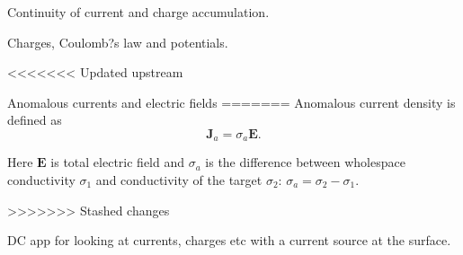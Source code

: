 \documentclass[11pt,letterpaper,leqno]{amsart}
\numberwithin{equation}{section}
\begin{document}
\vspace{0.4cm}

Continuity of current and charge accumulation. 

 \vspace{0.4cm}

Charges, Coulomb?s law and potentials.

<<<<<<< Updated upstream
 \vspace{0.4cm}

Anomalous currents and electric fields
=======
Anomalous current density is defined as 
\begin{equation*}
\mathbf{J}_a = \sigma_a\mathbf{E}.
\end{equation*}

Here $\mathbf{E}$ is total electric field and $\sigma_a$ is the difference between wholespace conductivity $\sigma_1$ and conductivity of the target $\sigma_2$: $\sigma_a = \sigma_2-\sigma_1$.

>>>>>>> Stashed changes

 \vspace{0.4cm}

DC app for looking at currents, charges etc with a current source at the surface.

 \vspace{0.4cm}
\end{document}
